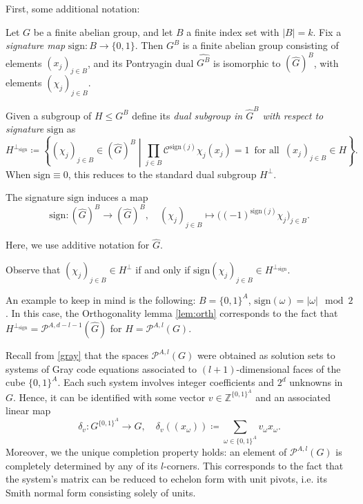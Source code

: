 \documentclass{amsart}
\theoremstyle{definition}
\theoremstyle{remark}
\numberwithin{equation}{section}
\begin{document}
First, some additional notation:

Let $G$ be a finite abelian group, and let $B$ a finite index set with $|B|=k$. Fix a \textit{signature map} $\mathrm{sign}:B \to \{0,1\}$. Then $G^B$ is a finite abelian group consisting of elements $(x_j)_{j\in B}$, and its Pontryagin dual $\widehat{G^B}$ is isomorphic to ${(\widehat{G})^B}$, with elements $(\chi_j)_{j\in B}$. 

Given a subgroup of $H \le G^B$ define its {\it dual subgroup in ${\widehat{G}}^B$ with respect to signature} $\mathrm{sign}$ as 
$$ H^{\perp_{\mathrm{sign}}} \coloneqq \left\{ (\chi_j)_{j\in B} \in (\widehat{G})^B \middle| \prod_{j \in B}  \mathcal{C}^{\mathrm{sign}(j)} \chi_j(x_j) = 1 \, \text{ for all } \, (x_j)_{j \in B} \in H \right\} .$$
When $\mathrm{sign} \equiv 0$, this reduces to the standard dual subgroup  $H^\perp$.

The signature $\mathrm{sign}$ induces a map
$$ \mathrm{sign} : (\widehat{G})^B \to (\widehat{G})^B, \quad (\chi_j)_{j \in B} \mapsto \bigl( (-1)^{\mathrm{sign}(j)} \chi_j \bigr)_{j \in B}.$$

Here, we use additive notation for $\widehat{G}$.

Observe that $(\chi_j)_{j \in B} \in H^\perp$ if and only if $\mathrm{sign}(\chi_j)_{j \in B} \in H^{\perp_{\mathrm{sign}}}$.

An example to keep in mind is the following:  $B=\{0,1\}^A$, $\mathrm{sign}(\omega)= |\omega| \mod 2$. In this case, the Orthogonality lemma \ref{lem:orth} corresponds to the fact that $H^{\perp_{\mathrm{sign}}} = \mathcal{P}^{A,d - l -1}(\widehat{G})$ for $H= \mathcal{P}^{A,l}(G)$.

Recall from \eqref{gray} that the spaces $\mathcal{P}^{A,l}(G)$ were obtained as solution sets to systems of Gray code equations associated to $(l+1)$-dimensional faces of the cube $\{0,1\}^A$. Each such system involves integer coefficients and $2^d$ unknowns in $G$.  Hence, it can be identified with some vector $v \in \mathbb{Z}^{\{0,1\}^A}$ and an associated linear map 
$$ \delta_v : G^{\{0,1\}^A} \to G, \quad \delta_v((x_\omega)) \coloneqq \sum_{\omega \in \{0,1\}^A} v_\omega x_\omega.$$
Moreover, we the unique completion property holds: an element of $\mathcal{P}^{A,l}(G)$ is completely determined by any of its $l$-corners. This corresponds to the fact that the system's matrix can be reduced to echelon form with unit pivots, i.e. its  Smith normal form consisting solely of units.
\end{document}
